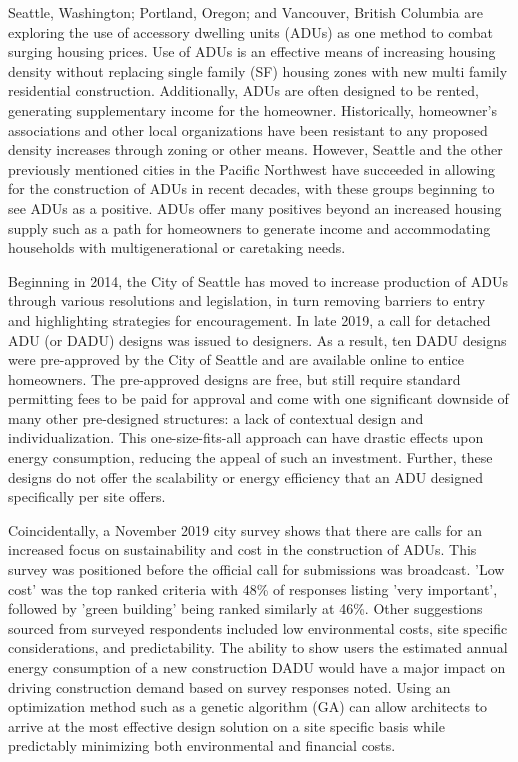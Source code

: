 \documentclass[sagev,times,Royal]{sagej}
\begin{document}
Seattle, Washington; Portland, Oregon; and Vancouver, British Columbia are exploring the use of accessory dwelling units (ADUs) as one method to combat surging housing prices. Use of ADUs is an effective means of increasing housing density without replacing single family (SF) housing zones with new multi family residential construction. Additionally, ADUs are often designed to be rented, generating supplementary income for the homeowner. Historically, homeowner’s associations and other local organizations have  been resistant to any proposed density increases through zoning or other means\cite{10.2307/24392672}. However, Seattle and the other previously mentioned cities in the Pacific Northwest have succeeded in allowing for the construction of ADUs in recent decades, with these groups beginning to see ADUs as a positive. ADUs offer many positives beyond an increased housing supply such as a path for homeowners to generate income and accommodating households with multigenerational or caretaking needs.

Beginning in 2014, the City of Seattle has moved to increase production of ADUs through various resolutions and legislation, in turn removing barriers to entry and highlighting strategies for encouragement. In late 2019, a call for detached ADU (or DADU) designs was issued to designers. As a result, ten DADU designs were pre-approved by the City of Seattle and are available online to entice homeowners\cite{ADUniversePreapprovedADU}. The pre-approved designs are free, but still require standard permitting fees to be paid for approval and come with one significant downside of many other pre-designed structures: a lack of contextual design and individualization. This one-size-fits-all approach can have drastic effects upon energy consumption, reducing the appeal of such an investment. Further, these designs do not offer the scalability or energy efficiency that an ADU designed specifically per site offers.

 Coincidentally, a November 2019 city survey shows that there are calls for an increased focus on sustainability and cost in the construction of ADUs\cite{seattlePreapprovedPlansAccessory2019}. This survey was positioned before the official call for submissions was broadcast. 'Low cost' was the top ranked criteria with 48\% of responses listing 'very important', followed by 'green building' being ranked similarly at 46\%. Other suggestions sourced from surveyed respondents included low environmental costs, site specific considerations, and predictability. The ability to show users the estimated annual energy consumption of a new construction DADU would have a major impact on driving construction demand based on survey responses noted. Using an optimization method such as a genetic algorithm (GA) can allow architects to arrive at the most effective design solution on a site specific basis while predictably minimizing both environmental and financial costs. 
 
\end{document}
